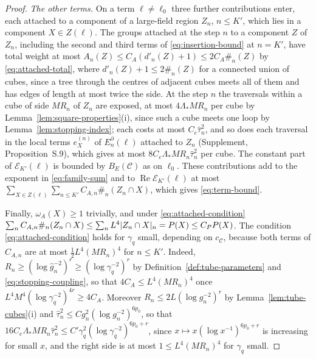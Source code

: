 \documentclass[11pt]{preprint}
\DeclarePairedDelimiter{\abs}{\lvert}{\rvert}
\numberwithin{equation}{section}
\theoremstyle{definition}
\theoremstyle{remark}
\theoremstyle{plain}
\begin{document}
\begin{proof}
\emph{The other terms.} On a term $\ell \neq \ell_0$ three further contributions enter, each attached to a component of a large-field region $Z_n$, $n \leq K'$, which lies in a component $X \in Z(\ell)$. The groups attached at the step $n$ to a component $Z$ of $Z_n$, including the second and third terms of \eqref{eq:insertion-bound} at $n = K'$, have total weight at most $A_n(Z) \leq C_A(d'_n(Z) + 1) \leq 2C_A\#_n(Z)$ by \eqref{eq:attached-total}, where $d'_n(Z) + 1 \leq 2\#_n(Z)$ for a connected union of cubes, since a tree through the centres of adjacent cubes meets all of them and has edges of length at most twice the side. At the step $n$ the traversals within a cube of side $MR_n$ of $Z_n$ are exposed, at most $4\Lambda_*MR_n$ per cube by Lemma~\ref{lem:square-properties}(i), since such a cube meets one loop by Lemma~\ref{lem:stopping-index}; each costs at most $C_e\hat\tau_n^2$, and so does each traversal in the local terms $e^{(n)}_X$ of $E^\partial_n(\ell)$ attached to $Z_n$ (Supplement, Proposition~S.9), which gives at most $8C_e\Lambda_*MR_n\hat\tau_n^2$ per cube. The constant part of $\mathcal E_{K'}(\ell)$ is bounded by $B_E(\mathcal C)$ as on $\ell_0$. These contributions add to the exponent in \eqref{eq:family-sum} and to $\operatorname{Re}\mathcal E_{K'}(\ell)$ at most $\sum_{X \in Z(\ell)}\sum_{n \leq K'}C_{A,n}\#_n(Z_n \cap X)$, which gives \eqref{eq:term-bound}.

Finally, $\omega_A(X) \geq 1$ trivially, and under \eqref{eq:attached-condition} $\sum_nC_{A,n}\#_n(Z_n \cap X) \leq \sum_nL^4\abs{Z_n \cap X}_n = P(X) \leq C_PP(X)$. The condition \eqref{eq:attached-condition} holds for $\gamma_q$ small, depending on $c_{\mathcal C}$, because both terms of $C_{A,n}$ are at most $\frac12L^4(MR_n)^4$ for $n \leq K'$. Indeed, $R_n \geq (\log\hat g_n^{-2})^r \geq (\log\gamma_q^{-2})^r$ by Definition~\ref{def:tube-parameters} and \eqref{eq:stopping-coupling}, so that $4C_A \leq L^4(MR_n)^4$ once $L^4M^4(\log\gamma_q^{-2})^{4r} \geq 4C_A$. Moreover $R_n \leq 2L(\log g_n^{-2})^r$ by Lemma~\ref{lem:tube-cubes}(i) and $\hat\tau_n^2 \leq Cg_n^2(\log g_n^{-2})^{6p_0}$, so that $16C_e\Lambda_*MR_n\hat\tau_n^2 \leq C'\gamma_q^2(\log\gamma_q^{-2})^{6p_0+r}$, since $x \mapsto x(\log x^{-1})^{6p_0+r}$ is increasing for small $x$, and the right side is at most $1 \leq L^4(MR_n)^4$ for $\gamma_q$ small.
\end{proof}
\end{document}
